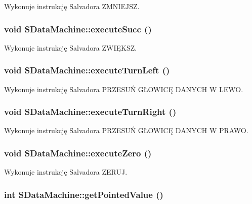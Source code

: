 Wykonuje instrukcję Salvadora ZMNIEJSZ. \hypertarget{classSDataMachine_85832e07e2fb8ae32160fe0c95a487d2}{
\subsubsection[{executeSucc}]{\setlength{\rightskip}{0pt plus 5cm}void SDataMachine::executeSucc ()}}
\label{classSDataMachine_85832e07e2fb8ae32160fe0c95a487d2}


Wykonuje instrukcję Salvadora ZWIĘKSZ. \hypertarget{classSDataMachine_5b46d50c18bec1bcfd5232bec3875fd5}{
\subsubsection[{executeTurnLeft}]{\setlength{\rightskip}{0pt plus 5cm}void SDataMachine::executeTurnLeft ()}}
\label{classSDataMachine_5b46d50c18bec1bcfd5232bec3875fd5}


Wykonuje instrukcję Salvadora PRZESUŃ GŁOWICĘ DANYCH W LEWO. \hypertarget{classSDataMachine_fb6f52c7f14afa51eed848f354d57924}{
\subsubsection[{executeTurnRight}]{\setlength{\rightskip}{0pt plus 5cm}void SDataMachine::executeTurnRight ()}}
\label{classSDataMachine_fb6f52c7f14afa51eed848f354d57924}


Wykonuje instrukcję Salvadora PRZESUŃ GŁOWICĘ DANYCH W PRAWO. \hypertarget{classSDataMachine_27c3e6dfe9ac45f9d5eed7c97f96abd8}{
\subsubsection[{executeZero}]{\setlength{\rightskip}{0pt plus 5cm}void SDataMachine::executeZero ()}}
\label{classSDataMachine_27c3e6dfe9ac45f9d5eed7c97f96abd8}


Wykonuje instrukcję Salvadora ZERUJ. \hypertarget{classSDataMachine_3a191be9cab718274d6bd75e01cc2a26}{
\subsubsection[{getPointedValue}]{\setlength{\rightskip}{0pt plus 5cm}int SDataMachine::getPointedValue ()}}
\label{classSDataMachine_3a191be9cab718274d6bd75e01cc2a26}


